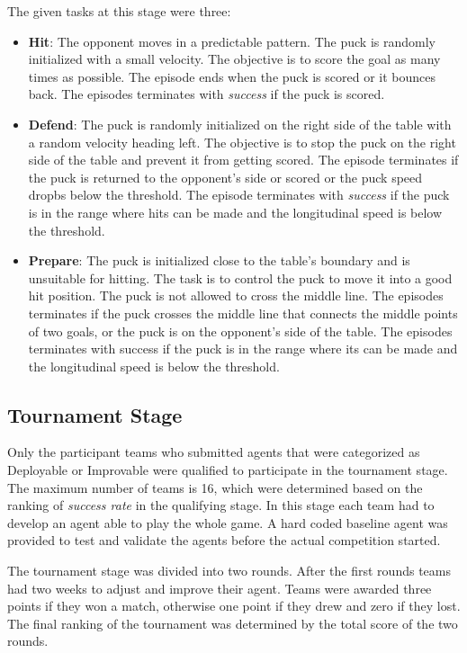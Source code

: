The given tasks at this stage were three:

\begin{itemize}
    \item \textbf{Hit}: The opponent moves in a predictable pattern. The puck is randomly initialized with a small velocity. The objective is to score the goal as many times as possible.
    The episode ends when the puck is scored or it bounces back. The episodes terminates with \textit{success} if the puck is scored.
    \item \textbf{Defend}: The puck is randomly initialized on the right side of the table with a random velocity heading left.
    The objective is to stop the puck on the right side of the table and prevent it from getting scored.
    The episode terminates if the puck is returned to the opponent's side or scored or the puck speed dropbs below the threshold.
    The episode terminates with \textit{success} if the puck is in the range where hits can be made and the longitudinal speed is below the threshold.
    \item \textbf{Prepare}: The puck is initialized close to the table's boundary and is unsuitable for hitting. The task is to control the puck to move it into a good hit position. The puck is not allowed to cross the middle line.
    The episodes terminates if the puck crosses the middle line that connects the middle points of two goals, or the puck is on the opponent's side of the table.
    The episodes terminates with success if the puck is in the range where its can be made and the longitudinal speed is below the threshold.
\end{itemize}

\subsection{Tournament Stage}
Only the participant teams who submitted agents that were categorized as Deployable or Improvable were qualified to participate in the tournament stage.
The maximum number of teams is 16, which were determined based on the ranking of \textit{success rate} in the qualifying stage.
In this stage each team had to develop an agent able to play the whole game.
A hard coded baseline agent was provided to test and validate the agents before the actual competition started. 

The tournament stage was divided into two rounds. After the first rounds teams had two weeks to adjust and improve their agent.
Teams were awarded three points if they won a match, otherwise one point if they drew and zero if they lost.
The final ranking of the tournament was determined by the total score of the two rounds.

